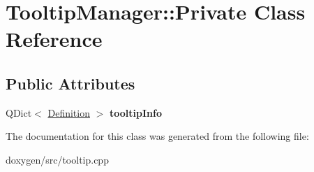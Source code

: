 \hypertarget{class_tooltip_manager_1_1_private}{}\section{Tooltip\+Manager\+::Private Class Reference}
\label{class_tooltip_manager_1_1_private}
\subsection*{Public Attributes}
\begin{DoxyCompactItemize}
\item 
\mbox{\label{class_tooltip_manager_1_1_private_a32f0f1faaa5aa0f53818e854ef87b8e1}} 
Q\+Dict$<$ \mbox{\hyperlink{class_definition}{Definition}} $>$ {\bfseries tooltip\+Info}
\end{DoxyCompactItemize}


The documentation for this class was generated from the following file\+:\begin{DoxyCompactItemize}
\item 
doxygen/src/tooltip.\+cpp\end{DoxyCompactItemize}
